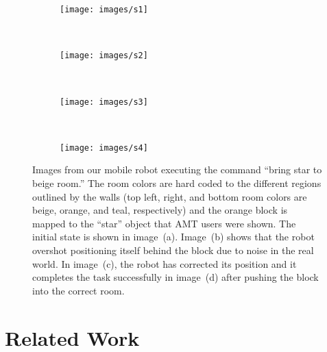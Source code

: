 \documentclass[conference]{IEEEtran}
\begin{document}
\begin{figure}
        \centering
        \begin{subfigure}[b]{0.23\textwidth}
                \texttt{[image: images/s1]}
                \caption{}
                \label{fig:real1}
        \end{subfigure}%
        ~ %
        \begin{subfigure}[b]{0.23\textwidth}
                \texttt{[image: images/s2]}
                \caption{}
                \label{fig:real2}
        \end{subfigure}
        ~ %
        \begin{subfigure}[b]{0.23\textwidth}
                \texttt{[image: images/s3]}
                \caption{}
                \label{fig:real3}
        \end{subfigure}
        ~
         \begin{subfigure}[b]{0.23\textwidth}
                \texttt{[image: images/s4]}
                \caption{}
                \label{fig:real4}
        \end{subfigure}
        \caption{Images from our mobile robot executing the command ``bring star to beige room.'' The room colors are hard coded to the different regions outlined by the walls (top left, right, and bottom room colors are beige, orange, and teal, respectively) and the orange block is mapped to the ``star'' object that AMT users were shown. The initial state is shown in image~(a). Image~(b) shows that the robot overshot positioning itself behind the block due to noise in the real world. In image~(c), the robot has corrected its position and it completes the task successfully in image~(d) after pushing the block into the correct room.} \label{fig:real}
\end{figure}

\section{Related Work}
\label{s:rel_work}

\end{document}
